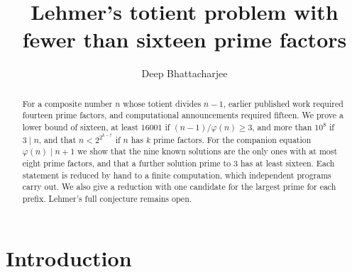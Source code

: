 \documentclass[screen,reqno]{aomart}
\title[Lehmer's totient problem]
{Lehmer's totient problem with fewer than sixteen prime factors}
\author{Deep Bhattacharjee}
\date{}
\numberwithin{equation}{section}
\theoremstyle{plain}
\theoremstyle{definition}
\theoremstyle{remark}
\begin{document}
\begin{abstract}
For a composite number $n$ whose totient divides $n-1$, earlier
published work required fourteen prime factors, and computational
announcements required fifteen. We prove a lower bound of sixteen,
at least $16001$ if $(n-1)/\varphi(n)\ge3$, and more than $10^8$ if
$3\mid n$, and that $n<2^{2^{k-7}}$ if $n$ has $k$ prime factors. For
the companion equation $\varphi(n)\mid n+1$ we show that the nine known
solutions are the only ones with at most eight prime factors, and that
a further solution prime to $3$ has at least sixteen. Each
statement is reduced by hand to a finite computation, which independent
programs carry out. We also give a reduction with one candidate for the
largest prime for each prefix. Lehmer's full conjecture remains open.
\end{abstract}

\maketitle

\section{Introduction}\label{sec:intro}
\end{document}
